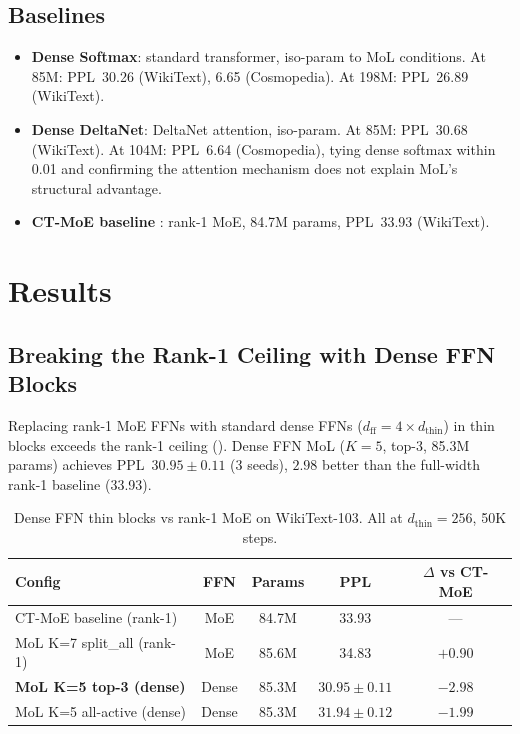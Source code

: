\documentclass[10pt]{article}
\newcommand{\dthin}{d_\text{thin}}
\begin{document}
\subsection{Baselines}

\begin{itemize}[nosep]
\item \textbf{Dense Softmax}: standard transformer, iso-param to MoL conditions. At 85M: PPL~30.26 (WikiText), 6.65 (Cosmopedia). At 198M: PPL~26.89 (WikiText).
\item \textbf{Dense DeltaNet}: DeltaNet attention, iso-param. At 85M: PPL~30.68 (WikiText). At 104M: PPL~6.64 (Cosmopedia), tying dense softmax within 0.01 and confirming the attention mechanism does not explain MoL's structural advantage.
\item \textbf{CT-MoE baseline} \citep{equifinality2026}: rank-1 MoE, 84.7M params, PPL~33.93 (WikiText).
\end{itemize}

\section{Results}
\label{sec:results}

\subsection{Breaking the Rank-1 Ceiling with Dense FFN Blocks}

Replacing rank-1 MoE FFNs with standard dense FFNs ($d_\text{ff} = 4 \times \dthin$) in thin blocks exceeds the rank-1 ceiling ().
Dense FFN MoL ($K{=}5$, top-3, 85.3M params) achieves PPL~$30.95 \pm 0.11$ (3 seeds), $2.98$ better than the full-width rank-1 baseline (33.93).

\begin{table}[t]
\centering
\caption{Dense FFN thin blocks vs rank-1 MoE on WikiText-103. All at $\dthin{=}256$, 50K steps.}
\label{tab:dense_mol}
\small
\begin{tabular}{lcccc}
\toprule
Config & FFN & Params & PPL & $\Delta$ vs CT-MoE \\
\midrule
CT-MoE baseline (rank-1) & MoE & 84.7M & 33.93 & --- \\
MoL K=7 split\_all (rank-1) & MoE & 85.6M & 34.83 & $+0.90$ \\
\midrule
\textbf{MoL K=5 top-3 (dense)} & Dense & 85.3M & $\mathbf{30.95 \pm 0.11}$ & $\mathbf{-2.98}$ \\
MoL K=5 all-active (dense) & Dense & 85.3M & $31.94 \pm 0.12$ & $-1.99$ \\
\bottomrule
\end{tabular}
\end{table}
\end{document}
